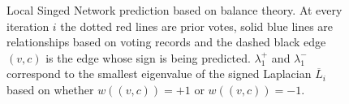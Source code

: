 \begin{figure}[!ht]
  


    \caption{Local Singed Network prediction based on balance theory. At every iteration $i$ the dotted red lines are prior votes, solid blue lines are relationships based on voting records and the dashed black edge $(v,c)$ is the edge whose sign is being predicted. $\lambda_1^+$ and $\lambda_1^-$ correspond to the smallest eigenvalue of the signed Laplacian $\overline{L}_i$ based on whether $w((v,c))=+1$ or $w((v,c))=-1$.     }
    \label{}
\end{figure}